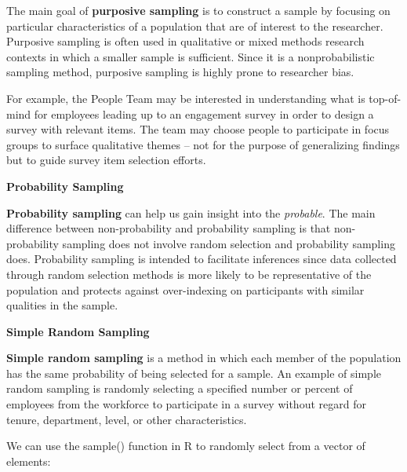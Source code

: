 \documentclass[]{book}
\newenvironment{Shaded}{\begin{snugshade}}{\end{snugshade}}
\newcommand{\CommentTok}[1]{\textcolor[rgb]{0.56,0.35,0.01}{\textit{#1}}}
\newcommand{\DataTypeTok}[1]{\textcolor[rgb]{0.13,0.29,0.53}{#1}}
\newcommand{\DecValTok}[1]{\textcolor[rgb]{0.00,0.00,0.81}{#1}}
\newcommand{\KeywordTok}[1]{\textcolor[rgb]{0.13,0.29,0.53}{\textbf{#1}}}
\newcommand{\NormalTok}[1]{#1}
\newcommand{\OperatorTok}[1]{\textcolor[rgb]{0.81,0.36,0.00}{\textbf{#1}}}
\newcommand{\StringTok}[1]{\textcolor[rgb]{0.31,0.60,0.02}{#1}}
\begin{document}
The main goal of \textbf{purposive sampling} is to construct a sample by focusing on particular characteristics of a population that are of interest to the researcher. Purposive sampling is often used in qualitative or mixed methods research contexts in which a smaller sample is sufficient. Since it is a nonprobabilistic sampling method, purposive sampling is highly prone to researcher bias.

For example, the People Team may be interested in understanding what is top-of-mind for employees leading up to an engagement survey in order to design a survey with relevant items. The team may choose people to participate in focus groups to surface qualitative themes -- not for the purpose of generalizing findings but to guide survey item selection efforts.

\textbf{Probability Sampling}

\textbf{Probability sampling} can help us gain insight into the \emph{probable}. The main difference between non-probability and probability sampling is that non-probability sampling does not involve random selection and probability sampling does. Probability sampling is intended to facilitate inferences since data collected through random selection methods is more likely to be representative of the population and protects against over-indexing on participants with similar qualities in the sample.

\textbf{Simple Random Sampling}

\textbf{Simple random sampling} is a method in which each member of the population has the same probability of being selected for a sample. An example of simple random sampling is randomly selecting a specified number or percent of employees from the workforce to participate in a survey without regard for tenure, department, level, or other characteristics.

We can use the sample() function in R to randomly select from a vector of elements:

\begin{Shaded}
\end{Shaded}
\end{document}
